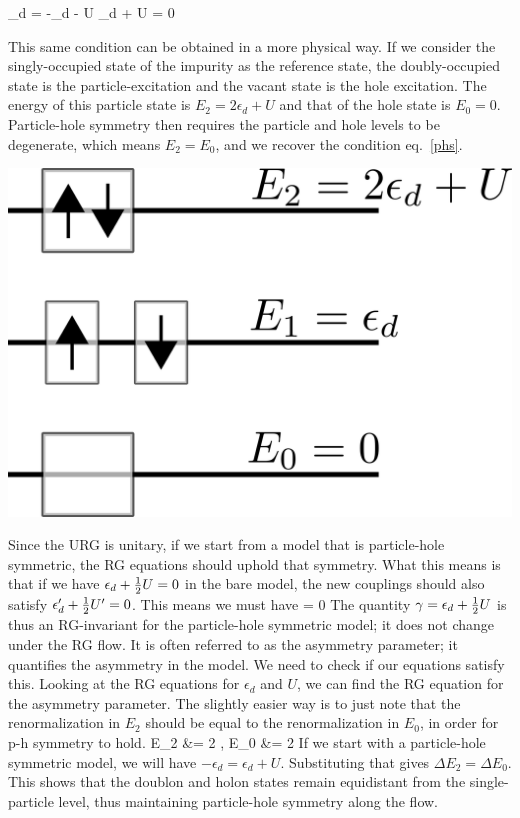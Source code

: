 \documentclass[12pt,twoside]{report}
\numberwithin{equation}{section}
\begin{document}
\beq[phs]
\epsilon_d = -\epsilon_d - U \implies \epsilon_d + \hf U = 0
\eeq
\begin{minipage}{260pt}
    This same condition can be obtained in a more physical way. If we consider the singly-occupied state of the impurity as the reference state, the doubly-occupied state is the particle-excitation and the vacant state is the hole excitation. The energy of this particle state is \(E_2 = 2\epsilon_d + U\) and that of the hole state is \(E_0 = 0\). Particle-hole symmetry then requires the particle and hole levels to be degenerate, which means \(E_2 = E_0\), and we recover the condition eq.~\ref{phs}.
\end{minipage}
\hspace*{15pt}\begin{minipage}{200pt}
    \centering\includegraphics[scale=0.3]{phsymm.png}
\end{minipage}
\pb Since the URG is unitary, if we start from a model that is particle-hole symmetric, the RG equations should uphold that symmetry. What this means is that if we have \(\epsilon_d + \frac{1}{2} U = 0\) in the bare model, the new couplings should also satisfy \(\epsilon_d^\prime + \frac{1}{2} U^\prime = 0\). This means we must have 
\beq
\Delta{} = 0
\eeq
The quantity \(\gamma = \epsilon_d + \frac{1}{2} U\) is thus an RG-invariant for the particle-hole symmetric model; it does not change under the RG flow. It is often referred to as the asymmetry parameter; it quantifies the asymmetry in the model. We need to check if our equations satisfy this. Looking at the RG equations for \(\epsilon_d\) and \(U\), we can find the RG equation for the asymmetry parameter. The slightly easier way is to just note that the renormalization in \(E_2\) should be equal to the renormalization in \(E_0\), in order for p-h symmetry to hold.
\beq
\Delta E_2 &= 2 \frac{\Delta}{\pi}, \Delta E_0 &= 2 \frac{\Delta}{\pi}
\eeq
If we start with a particle-hole symmetric model, we will have \(-\epsilon_d = \epsilon_d + U\). Substituting that gives \(\Delta E_2= \Delta E_0\). This shows that the doublon and holon states remain equidistant from the single-particle level, thus maintaining particle-hole symmetry along the flow.
\end{document}
